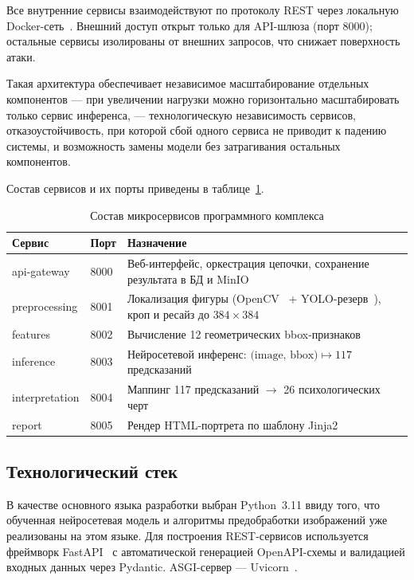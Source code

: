 Все внутренние сервисы взаимодействуют по протоколу REST через локальную Docker-сеть~\cite{docker}. Внешний доступ открыт только для API-шлюза (порт 8000); остальные сервисы изолированы от внешних запросов, что снижает поверхность атаки.

Такая архитектура обеспечивает независимое масштабирование отдельных компонентов --- при увеличении нагрузки можно горизонтально масштабировать только сервис инференса, --- технологическую независимость сервисов, отказоустойчивость, при которой сбой одного сервиса не приводит к падению системы, и возможность замены модели без затрагивания остальных компонентов.

Состав сервисов и их порты приведены в таблице~\ref{services-list}.

\begin{table}
    \caption{Состав микросервисов программного комплекса}
    \fontsize{12pt}{14pt}\selectfont
    \begin{tabular}{|p{30mm}|p{15mm}|p{99mm}|}\hline
        \textbf{Сервис} & \textbf{Порт} & \textbf{Назначение} \\ \hline
        api-gateway      & 8000  & Веб-интерфейс, оркестрация цепочки, сохранение результата в БД и MinIO \\ \hline
        preprocessing    & 8001  & Локализация фигуры (OpenCV~\cite{opencv} + YOLO-резерв~\cite{yolov8}), кроп и ресайз до $384 \times 384$ \\ \hline
        features         & 8002  & Вычисление 12 геометрических bbox-признаков \\ \hline
        inference        & 8003  & Нейросетевой инференс: $\text{(image, bbox)} \mapsto 117$ предсказаний \\ \hline
        interpretation   & 8004  & Маппинг 117 предсказаний $\rightarrow$ 26 психологических черт \\ \hline
        report           & 8005  & Рендер HTML-портрета по шаблону Jinja2 \\ \hline
    \end{tabular}
    \label{services-list}
\end{table}

\subsection{Технологический стек}

В качестве основного языка разработки выбран Python~3.11 ввиду того, что обученная нейросетевая модель и алгоритмы предобработки изображений уже реализованы на этом языке. Для построения REST-сервисов используется фреймворк FastAPI~\cite{fastapi} с автоматической генерацией OpenAPI-схемы и валидацией входных данных через Pydantic. ASGI-сервер --- Uvicorn~\cite{uvicorn}.

